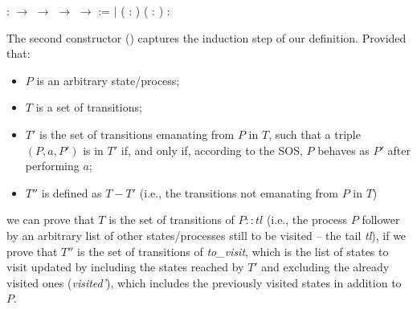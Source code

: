 \begin{coqdoccode}
	\coqdocnoindent
	  :\coqdoceol
	\coqdocindent{1.00em}
	 \ensuremath{\rightarrow} \coqdoceol
	\coqdocindent{1.00em}
	  \ensuremath{\rightarrow} \coqdoceol
	\coqdocindent{1.00em}
	  \ensuremath{\rightarrow} \coqdoceol
	\coqdocindent{1.00em}
	  \ensuremath{\rightarrow} \coqdoceol
	\coqdocindent{1.00em}
	 :=\coqdoceol
	\coqdocindent{1.00em}
	\ensuremath{|}  ( : ) ( :  ) :\coqdoceol
	\coqdocindent{3.00em}
	    \coqdoceol
	\coqdocindent{1.00em}
\end{coqdoccode}

The second constructor () captures the induction step of our definition. Provided that:
%
\begin{itemize}
	\item $P$ is an arbitrary state/process;
	\item $T$ is a set of transitions;
	\item $T'$ is the set of transitions emanating from $P$ in $T$, such that a triple $(P,a,P')$ is in $T'$ if, and only if, according to the SOS, $P$ behaves as $P'$ after performing $a$;
	\item $T''$ is defined as $T - T'$ (i.e., the transitions not emanating from $P$ in $T$)
\end{itemize}
%
we can prove that $T$ is the set of transitions of $P :: tl$ (i.e., the process $P$ follower by an arbitrary list of other states/processes still to be visited -- the tail \emph{tl}), if we prove that $T''$ is the set of transitions of \emph{to\_visit}, which is the list of states to visit updated by including the states reached by $T'$ and excluding the already visited ones (\emph{visited'}), which includes the previously visited states in addition to $P$.

